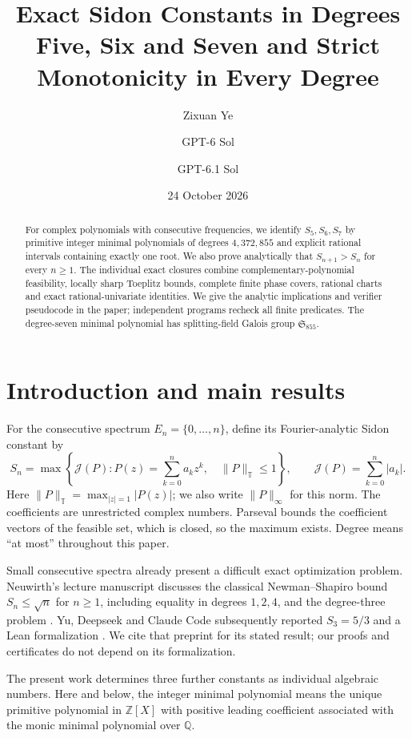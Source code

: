 \documentclass[11pt]{article}
\title{\textbf{Exact Sidon Constants in Degrees Five, Six and Seven and Strict Monotonicity in Every Degree}}
\author{Zixuan Ye \and GPT-6 Sol \and GPT-6.1 Sol}
\date{24 October 2026}
\newcommand{\T}{\mathbb T}
\newcommand{\J}{\mathcal J}
\begin{document}
\maketitle
\begin{abstract}
For complex polynomials with consecutive frequencies, we identify $S_5,S_6,S_7$
by primitive integer minimal polynomials of degrees $4,372,855$ and explicit
rational intervals containing exactly one root. We also prove analytically
that $S_{n+1}>S_n$ for every $n\ge1$. The individual exact closures combine
complementary-polynomial feasibility, locally sharp Toeplitz bounds,
complete finite phase covers, rational charts and exact rational-univariate
identities. We give the analytic implications and verifier pseudocode in the
paper; independent programs recheck all finite predicates. The degree-seven
minimal polynomial has splitting-field Galois group $\mathfrak S_{855}$.
\end{abstract}
\tableofcontents


\section{Introduction and main results}
For the consecutive spectrum $E_n=\{0,\ldots,n\}$, define its Fourier-analytic
Sidon constant by
\begin{equation}\label{eq:sidon-definition}
 S_n=\max\left\{\J(P):P(z)=\sum_{k=0}^na_kz^k,\quad
 \|P\|_\T\le1\right\},\qquad \J(P)=\sum_{k=0}^n|a_k|.
\end{equation}
Here $\|P\|_\T=\max_{|z|=1}|P(z)|$; we also write
$\|P\|_\infty$ for this norm. The coefficients are unrestricted complex
numbers. Parseval bounds the coefficient vectors of the feasible set,
which is closed, so the maximum exists. Degree means ``at most''
throughout this paper.

Small consecutive spectra already present a difficult exact optimization
problem. Neuwirth's lecture manuscript discusses the classical
Newman--Shapiro bound $S_n\le\sqrt n$ for $n\ge1$, including equality in
degrees $1,2,4$, and the degree-three problem \cite{Neuwirth2026}.
Yu, Deepseek and Claude Code subsequently reported $S_3=5/3$ and a Lean
formalization \cite{Yu2026}. We cite that preprint for its stated result;
our proofs and certificates do not depend on its formalization.

The present work determines three further constants as individual algebraic
numbers. Here and below, the integer minimal polynomial means the unique
primitive polynomial in $\mathbb Z[X]$ with positive leading coefficient
associated with the monic minimal polynomial over $\mathbb Q$.
\end{document}
